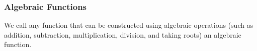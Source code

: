 \begin{frame}
\frametitle{Algebraic Functions}
\begin{definition}
We call any function that can be constructed using algebraic operations (such as addition, subtraction, multiplication, division, and taking roots) an algebraic function.
\end{definition}
\end{frame}
